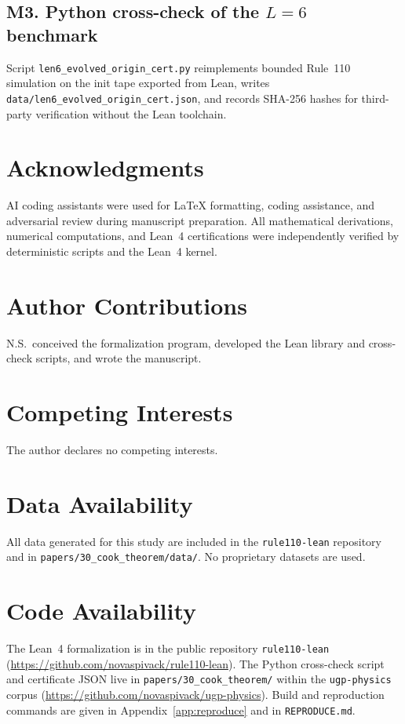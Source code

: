 \documentclass[11pt]{article}
\theoremstyle{remark}
\begin{document}
\subsection*{M3. Python cross-check of the $L{=}6$ benchmark}
Script \texttt{len6\_evolved\_origin\_cert.py} reimplements bounded Rule~110 simulation on the init tape exported from Lean, writes \texttt{data/len6\_evolved\_origin\_cert.json}, and records SHA-256 hashes for third-party verification without the Lean toolchain.

\section*{Acknowledgments}

AI coding assistants were used for LaTeX formatting, coding assistance, and adversarial review during manuscript preparation. All mathematical derivations, numerical computations, and Lean~4 certifications were independently verified by deterministic scripts and the Lean~4 kernel.

\section*{Author Contributions}
N.S.\ conceived the formalization program, developed the Lean library and cross-check scripts, and wrote the manuscript.

\section*{Competing Interests}
The author declares no competing interests.

\section*{Data Availability}
All data generated for this study are included in the \texttt{rule110-lean} repository and in \texttt{papers/30\_cook\_theorem/data/}.
No proprietary datasets are used.

\section*{Code Availability}
The Lean~4 formalization is in the public repository \texttt{rule110-lean}~\cite{rule110-lean}
(\url{https://github.com/novaspivack/rule110-lean}).
The Python cross-check script and certificate JSON live in \texttt{papers/30\_cook\_theorem/} within the \texttt{ugp-physics} corpus
(\url{https://github.com/novaspivack/ugp-physics}).
Build and reproduction commands are given in Appendix~\ref{app:reproduce} and in \texttt{REPRODUCE.md}.
\end{document}
